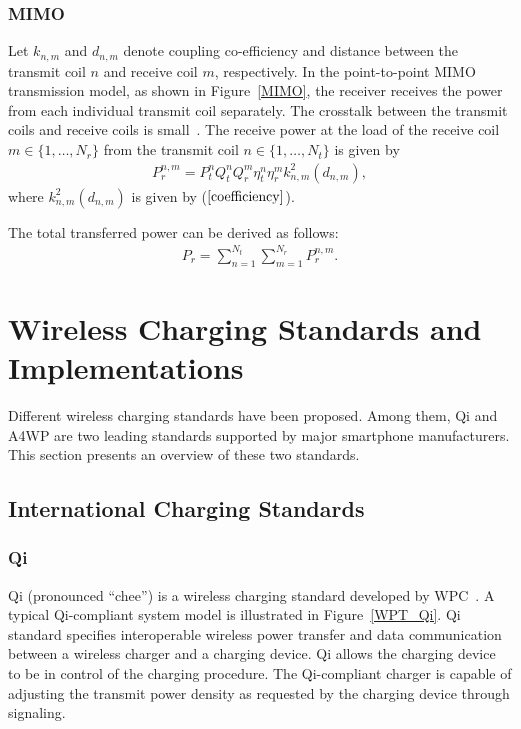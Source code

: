 \documentclass[twocolumn,10pt]{IEEEtran}
\begin{document}
 

\subsubsection{MIMO}

Let $k_{n,m}$ and $d_{n,m}$ denote coupling co-efficiency and distance between the transmit coil $n$ and receive coil $m$, respectively.
In the point-to-point MIMO transmission model, as shown in Figure~\ref{MIMO}, the receiver receives the power from each individual transmit coil separately. The crosstalk between the transmit coils and receive coils is small~\cite{H.2013Nguyen}. The receive power at the load of the receive coil $m \in \{1,\ldots,N_{r}\}$ from the transmit coil $n \in \{1,\ldots,N_{t}\}$  is given by
\begin{eqnarray}
P^{n,m}_{r}= P^{n}_{t} Q^{n}_{t} Q^{m}_{r} \eta^{n}_{t} \eta^{m}_{r} k^{2}_{n,m}(d_{n,m})	,
\end{eqnarray}
where $k^{2}_{n,m}(d_{n,m})$ is given by ($\ref{coefficiency}$).

The total transferred power can be derived as follows:
\begin{eqnarray}
P_{r}= \sum^{N_{t}}_{n=1} \sum^{N_{r}}_{m=1}  P^{n,m}_{r} .
\end{eqnarray}





\section{Wireless Charging Standards and Implementations}

Different wireless charging standards have been proposed. Among them, Qi and A4WP are two leading standards supported by major smartphone manufacturers. This section presents an overview of these two standards. 


\subsection{International Charging Standards}

\subsubsection{Qi}

Qi (pronounced ``chee'') is a wireless charging standard developed by WPC~\cite{WPC}. A typical Qi-compliant system model is illustrated in Figure~\ref{WPT_Qi}. Qi standard specifies interoperable wireless power transfer and data communication between a wireless charger and a charging device. Qi allows the charging device to be in control of the charging procedure. The Qi-compliant charger is capable of adjusting the transmit power density as requested by the charging device through signaling. 
\end{document}

